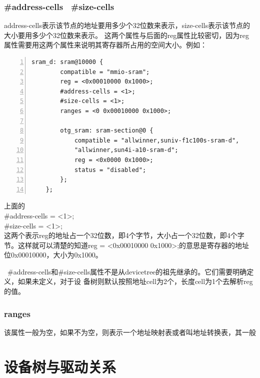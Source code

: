 \subsubsection{ \#address-cells \  \#size-cells}
address-cells表示该节点的地址要用多少个32位数来表示，size-cells表示该节点的大小要用多少个32位数来表示。
这两个属性与后面的reg属性比较密切，因为reg属性需要用这两个属性来说明其寄存器所占用的空间大小。例如：
\begin{lstlisting}[language={[ANSI]C},numbers=left,numberstyle=\tiny,frame=shadowbox,
	rulesepcolor=\color{red!20!green!20!blue!20},
	keywordstyle=\color{blue!70!black},
	commentstyle=\color{blue!90!},
	basicstyle=\ttfamily]
	sram_d: sram@10000 {
		compatible = "mmio-sram";
		reg = <0x00010000 0x1000>;
		#address-cells = <1>;
		#size-cells = <1>;
		ranges = <0 0x00010000 0x1000>;
		
		otg_sram: sram-section@0 {
			compatible = "allwinner,suniv-f1c100s-sram-d",
			"allwinner,sun4i-a10-sram-d";
			reg = <0x0000 0x1000>;
			status = "disabled";
		};
	};
\end{lstlisting}
上面的\\
\#address-cells = <1>;\\
\#size-cells = <1>;\\
这两个表示reg的地址占一个32位数，即4个字节，大小占一个32位数，即4个字节。这样就可以清楚的知道reg = 
<0x00010000 0x1000>;的意思是寄存器的地址位0x00010000，大小为0x1000。

\begin{tcolorbox}[colback=red!5!white,colframe=red!75!black]
	\faWarning\  
	\#address-cells和\#size-cells属性不是从devicetree的祖先继承的。它们需要明确定义，如果未定义，对于设
	备树则默认按照地址cell为2个，长度cell为1个去解析reg的值。
\end{tcolorbox}

\subsubsection{ranges}
该属性一般为空，如果不为空，则表示一个地址映射表或者叫地址转换表，其一般



\section{设备树与驱动关系}






